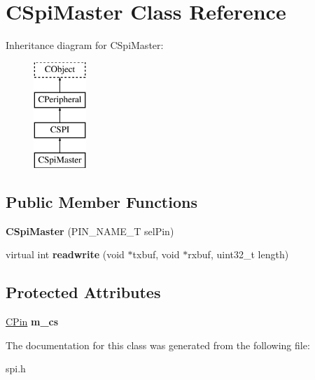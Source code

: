 \hypertarget{class_c_spi_master}{\section{C\-Spi\-Master Class Reference}
\label{class_c_spi_master}
}
Inheritance diagram for C\-Spi\-Master\-:\begin{figure}[H]
\begin{center}
\leavevmode
\includegraphics[height=4.000000cm]{class_c_spi_master}
\end{center}
\end{figure}
\subsection*{Public Member Functions}
\begin{DoxyCompactItemize}
\item 
\hypertarget{class_c_spi_master_ae8d9da2cee5e13a06c8ed5e4146e4800}{{\bfseries C\-Spi\-Master} (P\-I\-N\-\_\-\-N\-A\-M\-E\-\_\-\-T sel\-Pin)}\label{class_c_spi_master_ae8d9da2cee5e13a06c8ed5e4146e4800}

\item 
\hypertarget{class_c_spi_master_a13d1514765c41561d16dd46eefb9926e}{virtual int {\bfseries readwrite} (void $\ast$txbuf, void $\ast$rxbuf, uint32\-\_\-t length)}\label{class_c_spi_master_a13d1514765c41561d16dd46eefb9926e}

\end{DoxyCompactItemize}
\subsection*{Protected Attributes}
\begin{DoxyCompactItemize}
\item 
\hypertarget{class_c_spi_master_aee50dcd7bb052ad758e8bb5bf0362eb4}{\hyperlink{class_c_pin}{C\-Pin} {\bfseries m\-\_\-cs}}\label{class_c_spi_master_aee50dcd7bb052ad758e8bb5bf0362eb4}

\end{DoxyCompactItemize}


The documentation for this class was generated from the following file\-:\begin{DoxyCompactItemize}
\item 
spi.\-h\end{DoxyCompactItemize}
